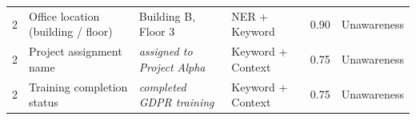 \documentclass[a4paper,12pt]{report}
\begin{document}
\begin{longtable}{
    C{0.8cm}
    L{3.0cm}
    L{3.2cm}
    L{2.8cm}
    C{0.8cm}
    L{2.5cm}
  }
  \small 2 & \small Office location (building / floor) &
  \small Building B, Floor 3 & \small NER + Keyword &
  \small 0.90 & \small Unawareness \\

  \small 2 & \small Project assignment name &
  \small \textit{assigned to Project Alpha} & \small Keyword + Context &
  \small 0.75 & \small Unawareness \\

  \small 2 & \small Training completion status &
  \small \textit{completed GDPR training} & \small Keyword + Context &
  \small 0.75 & \small Unawareness \\

  \bottomrule
\end{longtable}
\end{document}
